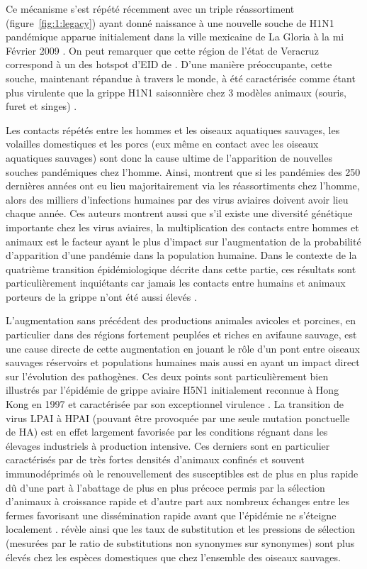 Ce mécanisme s'est répété récemment avec un triple réassortiment
(figure~\ref{fig:1:legacy}) ayant donné naissance à une nouvelle
souche de H1N1 pandémique apparue initialement dans la ville mexicaine
de La Gloria à la mi Février 2009 \citep{Fraser2009}. On peut
remarquer que cette région de l'état de Veracruz correspond à un des
hotspot d'EID de \citet{Jones2008}. D'une manière préoccupante, cette
souche, maintenant répandue à travers le monde, à été caractérisée
comme étant plus virulente que la grippe H1N1 saisonnière chez 3
modèles animaux (souris, furet et singes) \citep{Itoh2009}.

Les contacts répétés entre les hommes et les oiseaux aquatiques
sauvages, les volailles domestiques et les porcs (eux même en contact
avec les oiseaux aquatiques sauvages) sont donc la cause ultime de
l'apparition de nouvelles souches pandémiques chez l'homme. Ainsi,
\citet{Day2006} montrent que si les pandémies des 250 dernières années
ont eu lieu majoritairement via les réassortiments chez l'homme, alors
des milliers d'infections humaines par des virus aviaires doivent
avoir lieu chaque année. Ces auteurs montrent aussi que s'il existe
une diversité génétique importante chez les virus aviaires, la
multiplication des contacts entre hommes et animaux est le facteur
ayant le plus d'impact sur l'augmentation de la probabilité
d'apparition d'une pandémie dans la population humaine. Dans le
contexte de la quatrième transition épidémiologique décrite dans cette
partie, ces résultats sont particulièrement inquiétants car jamais les
contacts entre humains et animaux porteurs de la grippe n'ont été
aussi élevés \citep{Kapan2006, Leibler2009}.

L'augmentation sans précédent des productions animales avicoles et
porcines, en particulier dans des régions fortement peuplées et riches
en avifaune sauvage, est une cause directe de cette augmentation en
jouant le rôle d'un pont entre oiseaux sauvages réservoirs et
populations humaines mais aussi en ayant un impact direct sur
l'évolution des pathogènes. Ces deux points sont particulièrement bien
illustrés par l'épidémie de grippe aviaire H5N1 initialement reconnue
à Hong Kong en 1997 et caractérisée par son exceptionnel virulence
\citep{Jong2006}. La transition de virus LPAI à HPAI (pouvant être
provoquée par une seule mutation ponctuelle de HA) est en effet
largement favorisée par les conditions régnant dans les élevages
industriels à production intensive. Ces derniers sont en particulier
caractérisés par de très fortes densités d'animaux confinés et souvent
immunodéprimés où le renouvellement des susceptibles est de plus en
plus rapide dû d'une part à l'abattage de plus en plus précoce permis
par la sélection d'animaux à croissance rapide et d'autre part aux
nombreux échanges entre les fermes favorisant une dissémination rapide
avant que l'épidémie ne s'éteigne localement \citep{Leibler2009}.
\citet{Chen2006} révèle ainsi que les taux de substitution et les
pressions de sélection (mesurées par le ratio de substitutions non
synonymes sur synonymes) sont plus élevés chez les espèces domestiques
que chez l'ensemble des oiseaux sauvages.

